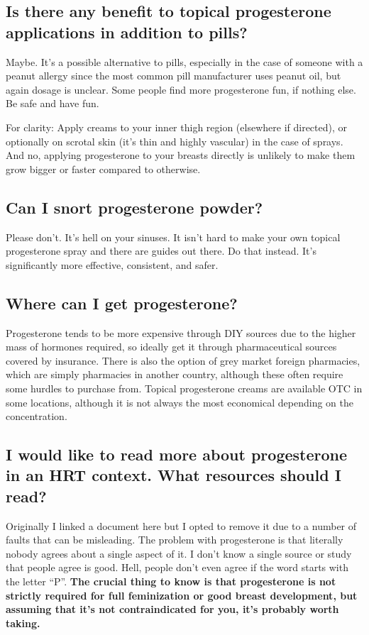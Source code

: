 \documentclass{article}
\begin{document}
{{\subsection{Is there any benefit to topical progesterone applications in addition to pills?}

Maybe. It's a possible alternative to pills, especially in the case of someone with a peanut allergy since the most common pill manufacturer uses peanut oil, but again dosage is unclear. Some people find more progesterone fun, if nothing else. Be safe and have fun.

For clarity: Apply creams to your inner thigh region (elsewhere if directed), or optionally on scrotal skin (it's thin and highly vascular) in the case of sprays. And no, applying progesterone to your breasts directly is unlikely to make them grow bigger or faster compared to otherwise. 

\subsection{Can I snort progesterone powder?}

Please don’t. It’s hell on your sinuses. It isn’t hard to make your own topical progesterone spray and there are guides out there. Do that instead. It’s significantly more effective, consistent, and safer.

\subsection{Where can I get progesterone?}

Progesterone tends to be more expensive through DIY sources due to the higher mass of hormones required, so ideally get it through pharmaceutical sources covered by insurance. There is also the option of grey market foreign pharmacies, which are simply pharmacies in another country, although these often require some hurdles to purchase from. Topical progesterone creams are available OTC in some locations, although it is not always the most economical depending on the concentration.

\subsection{I would like to read more about progesterone in an HRT context. What resources should I read?}\label{8-17}

Originally I linked a document here but I opted to remove it due to a number of faults that can be misleading. The problem with progesterone is that literally nobody agrees about a single aspect of it. I don't know a single source or study that people agree is good. Hell, people don't even agree if the word starts with the letter “P”. \textbf{The crucial thing to know is that progesterone is not strictly required for full feminization or good breast development, but assuming that it's not contraindicated for you, it's probably worth taking.}

}}
\end{document}
